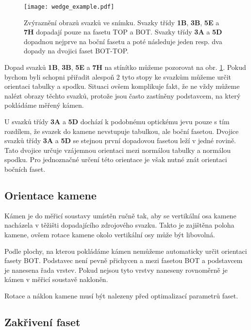 \begin{figure} [h!]
\centering
\texttt{[image: wedge\_example.pdf]}
\caption[Obrazy svazků ve snímku.]{Zvýraznění obrazů svazků ve snímku. Svazky třídy \textbf{1B}, \textbf{3B}, \textbf{5E} a \textbf{7H} dopadají pouze na fasetu TOP a BOT. Svazky třídy \textbf{3A} a \textbf{5D} dopadnou nejprve na boční fasetu a poté následuje jeden resp. dva dopady na dvojici faset BOT-TOP.}
\label{fig:wedge_example_image}
\end{figure}

\newpage
Dopad svazků  \textbf{1B}, \textbf{3B}, \textbf{5E} a \textbf{7H} na stínítko můžeme pozorovat na obr. \ref{fig:wedge_example_image}. Pokud bychom byli schopni přiřadit alespoň 2 tyto stopy ke svazkům můžeme určit orientaci tabulky a spodku. Situaci ovšem komplikuje fakt, že ne vždy můžeme nalézt obrazy těchto svazků, protože jsou často zastíněny podstavcem, na který pokládáme měřený kámen. 
 
 U svazků třídy \textbf{3A} a \textbf{5D} dochází k podobnému optickému jevu pouze s tím rozdílem, že svazek do kamene nevstupuje tabulkou, ale boční fasetou. Dvojice svazků třídy \textbf{3A} a \textbf{5D} se stejnou první dopadovou fasetou leží v jedné rovině.  Tato dvojice určuje vzájemnou orientaci mezi normálou tabulky a normálou spodku. Pro jednoznačné určení této orientace je však nutné znát orientaci bočních faset.  


\subsection{Orientace kamene}
Kámen je do měřicí soustavy umístěn ručně tak, aby se vertikální osa kamene nacházela v těžišti dopadajícího zdrojového svazku. Takto je zajištěna poloha kamene, ovšem rotace kamene okolo vertikální osy může být libovolná. 

Podle plochy, na kterou pokládáme kámen nemůžeme automaticky určit orientaci fasety BOT. Podstavec není pevně přichycen a mezi fasetou BOT a podstavcem je nanesena řada vrstev. Pokud nejsou tyto vrstvy naneseny rovnoměrně je kámen v měřicí soustavě nakloněn.

Rotace a náklon kamene musí být nalezeny před optimalizací parametrů faset. 



\subsection{Zakřivení faset} 

